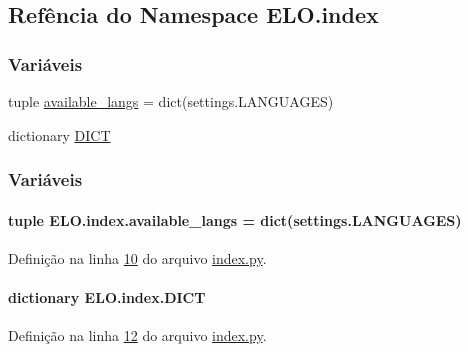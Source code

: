 \hypertarget{namespaceELO_1_1index}{}\subsection{Refência do Namespace E\+L\+O.\+index}
\label{namespaceELO_1_1index}
\subsubsection*{Variáveis}
\begin{DoxyCompactItemize}
\item 
tuple \hyperlink{namespaceELO_1_1index_aae899027d156c2d530d8eaead5e0a990}{available\+\_\+langs} = dict(settings.\+L\+A\+N\+G\+U\+A\+G\+E\+S)
\item 
dictionary \hyperlink{namespaceELO_1_1index_ada538ef183be3fce6bc34d0714e4e8cb}{D\+I\+C\+T}
\end{DoxyCompactItemize}


\subsubsection{Variáveis}
\hypertarget{namespaceELO_1_1index_aae899027d156c2d530d8eaead5e0a990}{}
\paragraph[{available\+\_\+langs}]{\setlength{\rightskip}{0pt plus 5cm}tuple E\+L\+O.\+index.\+available\+\_\+langs = dict(settings.\+L\+A\+N\+G\+U\+A\+G\+E\+S)}\label{namespaceELO_1_1index_aae899027d156c2d530d8eaead5e0a990}


Definição na linha \hyperlink{index_8py_source_l00010}{10} do arquivo \hyperlink{index_8py_source}{index.\+py}.

\hypertarget{namespaceELO_1_1index_ada538ef183be3fce6bc34d0714e4e8cb}{}
\paragraph[{D\+I\+C\+T}]{\setlength{\rightskip}{0pt plus 5cm}dictionary E\+L\+O.\+index.\+D\+I\+C\+T}\label{namespaceELO_1_1index_ada538ef183be3fce6bc34d0714e4e8cb}


Definição na linha \hyperlink{index_8py_source_l00012}{12} do arquivo \hyperlink{index_8py_source}{index.\+py}.

